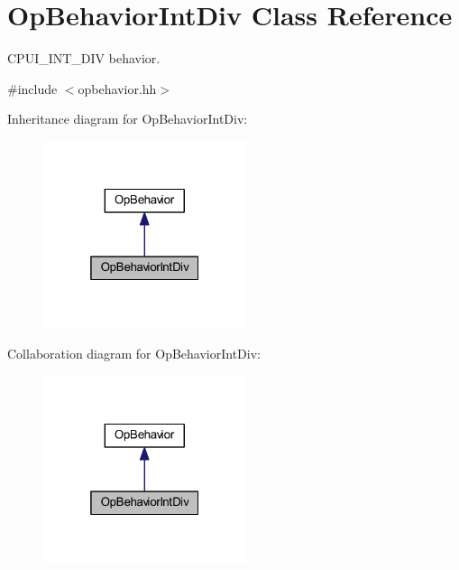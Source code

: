 \hypertarget{class_op_behavior_int_div}{}\section{Op\+Behavior\+Int\+Div Class Reference}
\label{class_op_behavior_int_div}


C\+P\+U\+I\+\_\+\+I\+N\+T\+\_\+\+D\+IV behavior.  




{\ttfamily \#include $<$opbehavior.\+hh$>$}



Inheritance diagram for Op\+Behavior\+Int\+Div\+:
\nopagebreak
\begin{figure}[H]
\begin{center}
\leavevmode
\includegraphics[width=169pt]{class_op_behavior_int_div__inherit__graph}
\end{center}
\end{figure}


Collaboration diagram for Op\+Behavior\+Int\+Div\+:
\nopagebreak
\begin{figure}[H]
\begin{center}
\leavevmode
\includegraphics[width=169pt]{class_op_behavior_int_div__coll__graph}
\end{center}
\end{figure}
